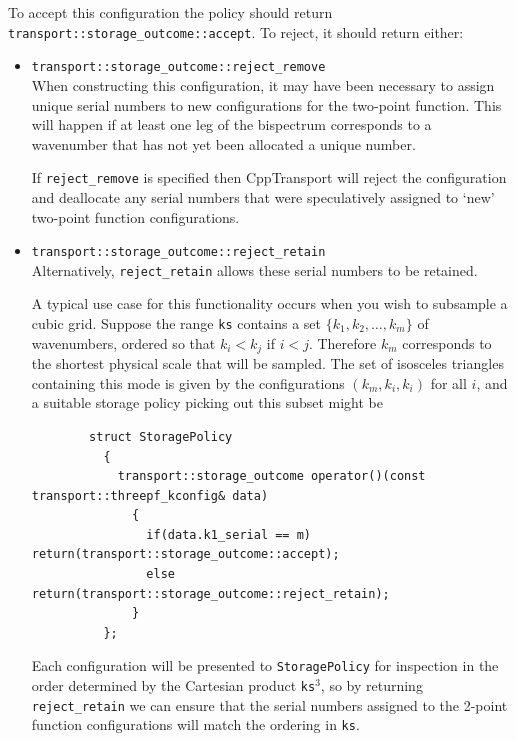 \documentclass[11pt,a4paper]{article}
\newcommand{\packagefont}{\sffamily}
\newcommand{\CppTransport}{{\packagefont CppTransport}}
\begin{document}
To accept this configuration the policy should return
\texttt{transport::storage_outcome::accept}.
To reject, it should return either:
\begin{itemize}
    \item \texttt{transport::storage_outcome::reject_remove} \\
    When constructing this configuration, it may have been necessary to assign
    unique serial numbers to new configurations for the two-point function.
    This will happen if at least one leg of the bispectrum corresponds to a wavenumber
    that has not yet been allocated a unique number.
    
    If \texttt{reject_remove} is specified then {\CppTransport} will
    reject the configuration and deallocate any serial numbers that were speculatively
    assigned to `new' two-point function configurations.
    
    \item \texttt{transport::storage_outcome::reject_retain} \\
    Alternatively, \texttt{reject_retain} allows these serial numbers to be
    retained.
    
    A typical use case for this functionality occurs when you wish to
    subsample a cubic grid.
    Suppose the range \texttt{ks} contains a set
    $\{ k_1, k_2, \ldots, k_m \}$ of wavenumbers, ordered so that
    $k_i < k_j$ if $i < j$.
    Therefore $k_m$ corresponds to the shortest physical scale that will be sampled.
    The set of isosceles triangles containing this mode
    is given by the configurations
    $(k_m, k_i, k_i)$ for all $i$, and a suitable storage policy picking out
    this subset might be
    \begin{verbatim}
        struct StoragePolicy
          {
            transport::storage_outcome operator()(const transport::threepf_kconfig& data)
              {
                if(data.k1_serial == m) return(transport::storage_outcome::accept);
                else                    return(transport::storage_outcome::reject_retain);
              }
          };
    \end{verbatim}
    Each configuration will be presented to
    \texttt{StoragePolicy} for inspection in the order
    determined by the Cartesian product \texttt{ks}$^3$,
    so by returning
    \texttt{reject_retain} we can ensure that the
    serial numbers assigned to the 2-point function configurations
    will match the ordering in \texttt{ks}.
\end{itemize}
\end{document}
